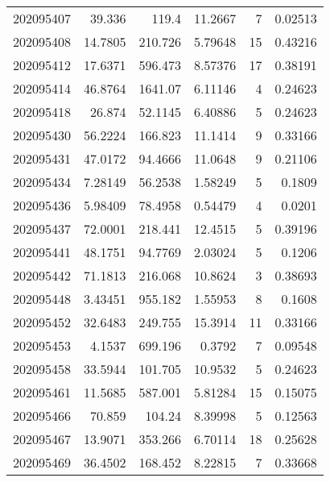\begin{tabular}{rrrrrr}
 202095407 &         39.336   &      119.4    &           11.2667  &           7 & 0.02513 \\
 202095408 &         14.7805  &      210.726  &            5.79648 &          15 & 0.43216 \\
 202095412 &         17.6371  &      596.473  &            8.57376 &          17 & 0.38191 \\
 202095414 &         46.8764  &     1641.07   &            6.11146 &           4 & 0.24623 \\
 202095418 &         26.874   &       52.1145 &            6.40886 &           5 & 0.24623 \\
 202095430 &         56.2224  &      166.823  &           11.1414  &           9 & 0.33166 \\
 202095431 &         47.0172  &       94.4666 &           11.0648  &           9 & 0.21106 \\
 202095434 &          7.28149 &       56.2538 &            1.58249 &           5 & 0.1809  \\
 202095436 &          5.98409 &       78.4958 &            0.54479 &           4 & 0.0201  \\
 202095437 &         72.0001  &      218.441  &           12.4515  &           5 & 0.39196 \\
 202095441 &         48.1751  &       94.7769 &            2.03024 &           5 & 0.1206  \\
 202095442 &         71.1813  &      216.068  &           10.8624  &           3 & 0.38693 \\
 202095448 &          3.43451 &      955.182  &            1.55953 &           8 & 0.1608  \\
 202095452 &         32.6483  &      249.755  &           15.3914  &          11 & 0.33166 \\
 202095453 &          4.1537  &      699.196  &            0.3792  &           7 & 0.09548 \\
 202095458 &         33.5944  &      101.705  &           10.9532  &           5 & 0.24623 \\
 202095461 &         11.5685  &      587.001  &            5.81284 &          15 & 0.15075 \\
 202095466 &         70.859   &      104.24   &            8.39998 &           5 & 0.12563 \\
 202095467 &         13.9071  &      353.266  &            6.70114 &          18 & 0.25628 \\
 202095469 &         36.4502  &      168.452  &            8.22815 &           7 & 0.33668 \\

\end{tabular}
